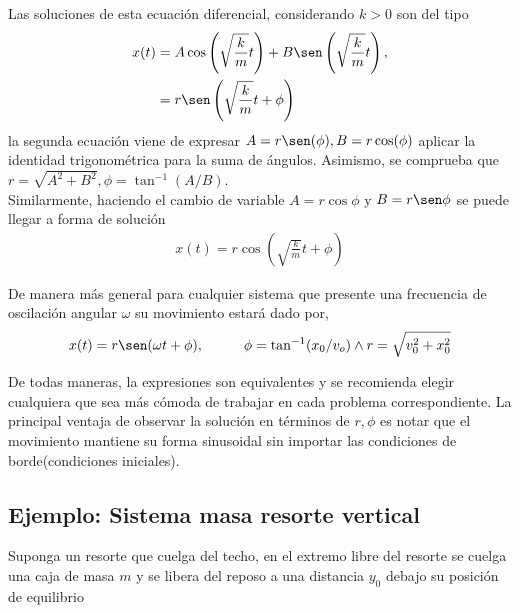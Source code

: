 \documentclass[12pt]{article}
\begin{document}
Las soluciones de esta ecuación diferencial, considerando \(k > 0 \) son del tipo 
\begin{align}
    x(t)&= A\cos\left(\sqrt{\frac{k}{m}}t\right) + B\sen\left(\sqrt{\frac{k}{m}}t\right),  \label{eq: solución-MAS}\\
     &= r \sen\left(\sqrt{\frac{k}{m}}t + \phi \right)  \label{eq: solución-MAS-variante seno}
\end{align}
la segunda ecuación viene de expresar \(A = r\sen(\phi) , B= r\cos(\phi)\) aplicar la identidad trigonométrica para la suma de ángulos. Asimismo, se comprueba que \(r= \sqrt{A^{2} + B^{2}} , \phi = \tan^{-1}(A/B)\). \\
Similarmente, haciendo el cambio de variable \(A= r \cos\phi\) y \(B = r\sen\phi\) se puede llegar a forma de solución
\begin{align}
    x(t) = r\cos\left( \sqrt{\frac{k}{m}}t + \phi \right) \label{eq: solución-MAS-variante seno}
\end{align}


De manera más general para cualquier sistema que presente una frecuencia de oscilación angular \(\omega\) su movimiento estará dado por, 
\begin{align}
    x(t) = r\sen(\omega t  + \phi),  \hspace{1cm} \phi = \tan^{-1}(x_{0}/v_{o})  \wedge r= \sqrt{v_{0}^{2} + x_{0}^{2}} \label{eq : x mas}
\end{align}

De todas maneras, la expresiones son equivalentes y se recomienda elegir cualquiera que sea más cómoda de trabajar en cada problema correspondiente. La principal ventaja de observar la solución en términos de \(r,\phi\) es notar que el movimiento mantiene su forma sinusoidal sin importar las condiciones de borde(condiciones iniciales). 


\newpage
\subsection*{Ejemplo: Sistema masa resorte vertical}
Suponga un resorte que cuelga del techo, en el extremo libre del resorte se cuelga una caja de masa \(m\) y se libera del reposo a una distancia \(y_0\) debajo su posición de equilibrio
\end{document}
